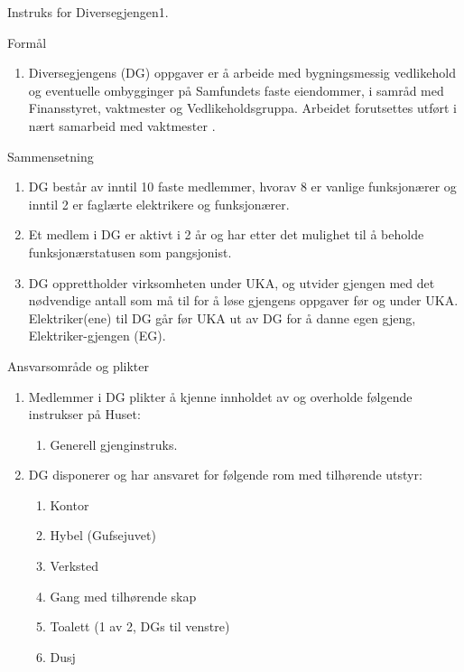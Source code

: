 
\begin{instruks}{Instruks for Diversegjengen}{1. }{ }

    \begin{instruksledd}{Formål}
        \begin{enumerate}
            \item Diversegjengens (DG) oppgaver er å arbeide med bygningsmessig vedlikehold og eventuelle
                ombygginger på Samfundets faste eiendommer, i samråd med Finansstyret, vaktmester og Vedlikeholdsgruppa.
                Arbeidet forutsettes utført i nært samarbeid med vaktmester .
        \end{enumerate}
    \end{instruksledd}

    \begin{instruksledd}{Sammensetning}
        \begin{enumerate}
            \item DG består av inntil 10 faste medlemmer, hvorav 8 er vanlige funksjonærer og inntil 2 er
                faglærte elektrikere og funksjonærer.
            \item Et medlem i DG er aktivt i 2 år og har etter det mulighet til å beholde
                funksjonærstatusen som pangsjonist.
            \item DG opprettholder virksomheten under UKA, og utvider gjengen med det nødvendige antall
                som må til for å løse gjengens oppgaver før og under UKA. Elektriker(ene) til DG går før UKA ut av DG for å
                danne egen gjeng, Elektriker-gjengen (EG).
        \end{enumerate}
     \end{instruksledd}

     \begin{instruksledd}{Ansvarsområde og plikter}
        \begin{enumerate}   
            \item  Medlemmer i DG plikter å kjenne innholdet av og overholde følgende instrukser på Huset:
                \begin{enumerate}
                    \item Generell gjenginstruks.
                \end{enumerate}
            \item DG disponerer og har ansvaret for følgende rom med tilhørende utstyr:
                \begin{enumerate}
                    \item Kontor
                    \item Hybel (Gufsejuvet)
                    \item Verksted
                    \item Gang med tilhørende skap
                    \item Toalett (1 av 2, DGs til venstre)
                    \item  Dusj
                \end{enumerate}
        \end{enumerate}
     \end{instruksledd}
     

\end{instruks}
